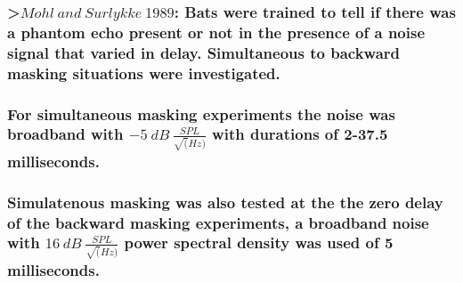 \documentclass[11pt]{article}
\begin{document}
\hypertarget{mohl-and-surlykke-1989-bats-were-trained-to-tell-if-there-was-a-phantom-echo-present-or-not-in-the-presence-of-a-noise-signal-that-varied-in-delay.-simultaneous-to-backward-masking-situations-were-investigated.}{%
\subsubsection{\texorpdfstring{\textgreater{}\href{https://link.springer.com/article/10.1007\%2FBF00613805?LI=true}{\(Mohl\ and\ Surlykke\ 1989\)}:
Bats were trained to tell if there was a phantom echo present or not in
the presence of a noise signal that varied in delay. Simultaneous to
backward masking situations were
investigated.}{\textgreater{}Mohl\textbackslash{} and\textbackslash{} Surlykke\textbackslash{} 1989: Bats were trained to tell if there was a phantom echo present or not in the presence of a noise signal that varied in delay. Simultaneous to backward masking situations were investigated.}}\label{mohl-and-surlykke-1989-bats-were-trained-to-tell-if-there-was-a-phantom-echo-present-or-not-in-the-presence-of-a-noise-signal-that-varied-in-delay.-simultaneous-to-backward-masking-situations-were-investigated.}}

\hypertarget{for-simultaneous-masking-experiments-the-noise-was-broadband-with--5-db-fracsplsqrthz-with-durations-of-2-37.5-milliseconds.}{%
\subsubsection{\texorpdfstring{For simultaneous masking experiments the
noise was broadband with \(-5\ dB\ \frac{SPL}{\sqrt(Hz)}\) with
durations of 2-37.5
milliseconds.}{For simultaneous masking experiments the noise was broadband with -5\textbackslash{} dB\textbackslash{} \textbackslash{}frac\{SPL\}\{\textbackslash{}sqrt(Hz)\} with durations of 2-37.5 milliseconds.}}\label{for-simultaneous-masking-experiments-the-noise-was-broadband-with--5-db-fracsplsqrthz-with-durations-of-2-37.5-milliseconds.}}

\hypertarget{simulatenous-masking-was-also-tested-at-the-the-zero-delay-of-the-backward-masking-experiments-a-broadband-noise-with-16-db-fracsplsqrthz-power-spectral-density-was-used-of-5-milliseconds.}{%
\subsubsection{\texorpdfstring{Simulatenous masking was also tested at
the the zero delay of the backward masking experiments, a broadband
noise with \(16\ dB\ \frac{SPL}{\sqrt(Hz)}\) power spectral density was
used of 5
milliseconds.}{Simulatenous masking was also tested at the the zero delay of the backward masking experiments, a broadband noise with 16\textbackslash{} dB\textbackslash{} \textbackslash{}frac\{SPL\}\{\textbackslash{}sqrt(Hz)\} power spectral density was used of 5 milliseconds.}}\label{simulatenous-masking-was-also-tested-at-the-the-zero-delay-of-the-backward-masking-experiments-a-broadband-noise-with-16-db-fracsplsqrthz-power-spectral-density-was-used-of-5-milliseconds.}}
\end{document}
